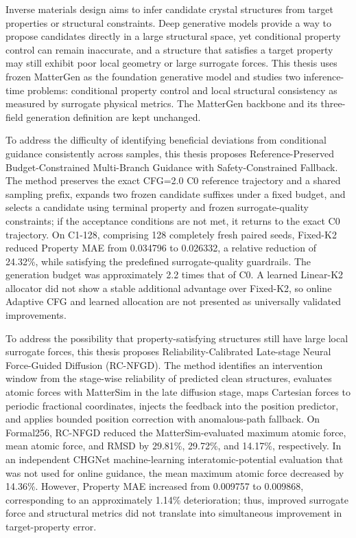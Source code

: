 \begin{EnglishAbstract}

Inverse materials design aims to infer candidate crystal structures from target properties or structural constraints. Deep generative models provide a way to propose candidates directly in a large structural space, yet conditional property control can remain inaccurate, and a structure that satisfies a target property may still exhibit poor local geometry or large surrogate forces. This thesis uses frozen MatterGen as the foundation generative model and studies two inference-time problems: conditional property control and local structural consistency as measured by surrogate physical metrics. The MatterGen backbone and its three-field generation definition are kept unchanged.

To address the difficulty of identifying beneficial deviations from conditional guidance consistently across samples, this thesis proposes Reference-Preserved Budget-Constrained Multi-Branch Guidance with Safety-Constrained Fallback. The method preserves the exact CFG=2.0 C0 reference trajectory and a shared sampling prefix, expands two frozen candidate suffixes under a fixed budget, and selects a candidate using terminal property and frozen surrogate-quality constraints; if the acceptance conditions are not met, it returns to the exact C0 trajectory. On C1-128, comprising 128 completely fresh paired seeds, Fixed-K2 reduced Property MAE from 0.034796 to 0.026332, a relative reduction of 24.32\%, while satisfying the predefined surrogate-quality guardrails. The generation budget was approximately 2.2 times that of C0. A learned Linear-K2 allocator did not show a stable additional advantage over Fixed-K2, so online Adaptive CFG and learned allocation are not presented as universally validated improvements.

To address the possibility that property-satisfying structures still have large local surrogate forces, this thesis proposes Reliability-Calibrated Late-stage Neural Force-Guided Diffusion (RC-NFGD). The method identifies an intervention window from the stage-wise reliability of predicted clean structures, evaluates atomic forces with MatterSim in the late diffusion stage, maps Cartesian forces to periodic fractional coordinates, injects the feedback into the position predictor, and applies bounded position correction with anomalous-path fallback. On Formal256, RC-NFGD reduced the MatterSim-evaluated maximum atomic force, mean atomic force, and RMSD by 29.81\%, 29.72\%, and 14.17\%, respectively. In an independent CHGNet machine-learning interatomic-potential evaluation that was not used for online guidance, the mean maximum atomic force decreased by 14.36\%. However, Property MAE increased from 0.009757 to 0.009868, corresponding to an approximately 1.14\% deterioration; thus, improved surrogate force and structural metrics did not translate into simultaneous improvement in target-property error.


\end{EnglishAbstract}
